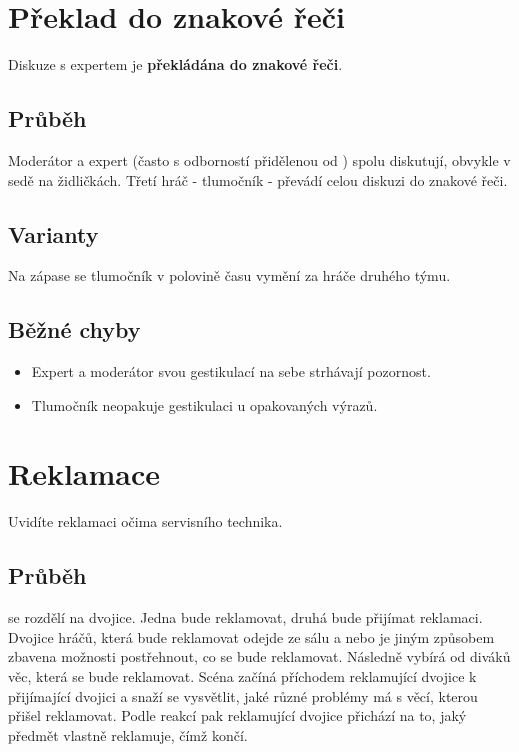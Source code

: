  
 
 
 
\needspace{5cm} \section{Překlad do znakové řeči} \label{překlad do znakové řeči}  
 
Diskuze s expertem je \textbf{překládána do znakové řeči}{}. 
 
\subsection{Průběh} Moderátor a expert (často s odborností přidělenou od ) spolu diskutují, obvykle v sedě na židličkách. Třetí hráč  - tlumočník  - převádí celou diskuzi do znakové řeči. 
 
\subsection{Varianty} Na zápase se tlumočník v polovině času vymění za hráče druhého týmu. 
 
\subsection{ Běžné chyby } \begin{itemize}
\item  Expert a moderátor svou gestikulací na sebe strhávají pozornost.
\item  Tlumočník neopakuje gestikulaci u opakovaných výrazů.
\end{itemize}
 
 
 
 
\needspace{5cm} \section{Reklamace} \label{reklamace}  
 
 
Uvidíte reklamaci očima servisního technika. 
 
 
\subsection{ Průběh }  se rozdělí na dvojice. Jedna bude reklamovat, druhá bude přijímat reklamaci. Dvojice hráčů, která bude reklamovat odejde ze sálu a nebo je jiným způsobem zbavena možnosti postřehnout, co se bude reklamovat. Následně  vybírá od diváků věc, která se bude reklamovat. Scéna začíná příchodem reklamující dvojice k přijímající dvojici a snaží se vysvětlit, jaké různé problémy má s věcí, kterou přišel reklamovat. Podle reakcí pak reklamující dvojice přichází na to, jaký předmět vlastně reklamuje, čímž  končí. 
 
